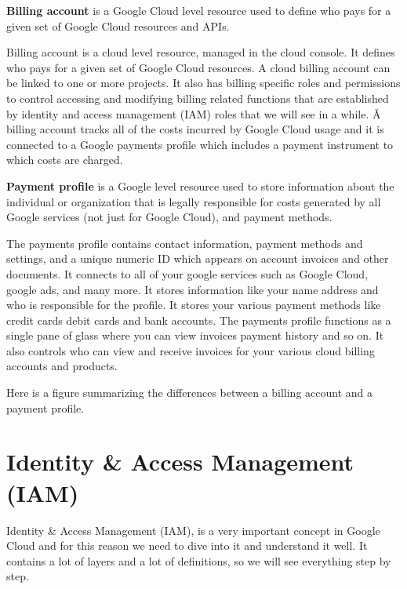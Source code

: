 \textbf{Billing account} is a Google Cloud level resource used to define who pays for a given set of Google Cloud
resources and APIs.
\ed

Billing account is a cloud level resource, managed in the cloud console. It defines who pays for a given set of
Google Cloud resources. A cloud billing account can be linked to one or more projects. It also has billing specific
roles and permissions to control accessing and modifying billing related functions that are established by identity
and access management (IAM) roles that we will see in a while. \v

A billing account tracks all of the costs incurred by Google Cloud usage and it is connected to a Google payments
profile which includes a payment instrument to which costs are charged.

\textbf{Payment profile} is a Google level resource used to store information about the individual or organization
that is legally responsible for costs generated by all Google services (not just for Google Cloud), and payment methods.
\ed

The payments profile contains contact information, payment methods and settings, and a unique numeric ID which
appears on account invoices and other documents. It connects to all of your google services such as Google Cloud,
google ads, and many more. It stores information like your name address and who is responsible for the profile. It
stores your various payment methods like credit cards debit cards and bank accounts. The payments profile functions
as a single pane of glass where you can view invoices payment history and so on. It also controls who can view and
receive invoices for your various cloud billing accounts and products.


Here is a figure summarizing the differences between a billing account and a payment profile.


\section{Identity \& Access Management (IAM)}

Identity \& Access Management (IAM), is a very important concept in Google Cloud and for this reason we need to dive
into it and understand it well. It contains a lot of layers and a lot of definitions, so we will see everything step
by step.

